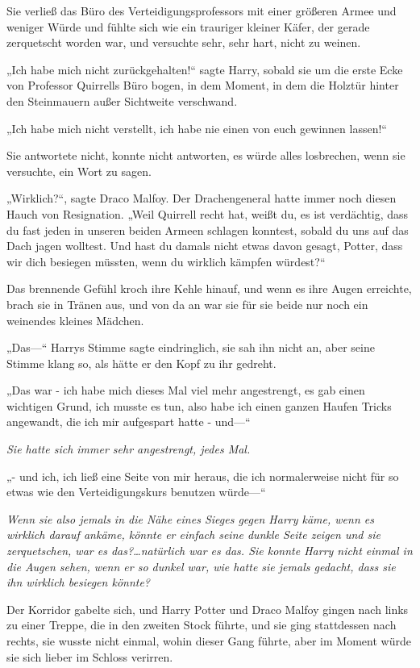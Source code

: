 {Sie verließ das Büro des Verteidigungsprofessors mit einer größeren Armee und weniger Würde und fühlte sich wie ein trauriger kleiner Käfer, der gerade zerquetscht worden war, und versuchte sehr, sehr hart, nicht zu weinen.

„Ich habe mich nicht zurückgehalten!“ sagte Harry, sobald sie um die erste Ecke von Professor Quirrells Büro bogen, in dem Moment, in dem die Holztür hinter den Steinmauern außer Sichtweite verschwand.

„Ich habe mich nicht verstellt, ich habe nie einen von euch gewinnen lassen!“

Sie antwortete nicht, konnte nicht antworten, es würde alles losbrechen, wenn sie versuchte, ein Wort zu sagen.

„Wirklich?“, sagte Draco Malfoy. Der Drachengeneral hatte immer noch diesen Hauch von Resignation. „Weil Quirrell recht hat, weißt du, es ist verdächtig, dass du fast jeden in unseren beiden Armeen schlagen konntest, sobald du uns auf das Dach jagen wolltest. Und hast du damals nicht etwas davon gesagt, Potter, dass wir dich besiegen müssten, wenn du wirklich kämpfen würdest?“

Das brennende Gefühl kroch ihre Kehle hinauf, und wenn es ihre Augen erreichte, brach sie in Tränen aus, und von da an war sie für sie beide nur noch ein weinendes kleines Mädchen.

„Das—“ Harrys Stimme sagte eindringlich, sie sah ihn nicht an, aber seine Stimme klang so, als hätte er den Kopf zu ihr gedreht.

„Das war - ich habe mich dieses Mal viel mehr angestrengt, es gab einen wichtigen Grund, ich musste es tun, also habe ich einen ganzen Haufen Tricks angewandt, die ich mir aufgespart hatte - und—“

\emph{Sie hatte sich immer sehr angestrengt, jedes Mal.}

„- und ich, ich ließ eine Seite von mir heraus, die ich normalerweise nicht für so etwas wie den Verteidigungskurs benutzen würde—“

\emph{Wenn sie also jemals in die Nähe eines Sieges gegen Harry käme, wenn es wirklich darauf ankäme, könnte er einfach seine dunkle Seite zeigen und sie zerquetschen, war es das?…natürlich war es das. Sie konnte Harry nicht einmal in die Augen sehen, wenn er so dunkel war, wie hatte sie jemals gedacht, dass sie ihn wirklich besiegen könnte?}

Der Korridor gabelte sich, und Harry Potter und Draco Malfoy gingen nach links zu einer Treppe, die in den zweiten Stock führte, und sie ging stattdessen nach rechts, sie wusste nicht einmal, wohin dieser Gang führte, aber im Moment würde sie sich lieber im Schloss verirren.

}
